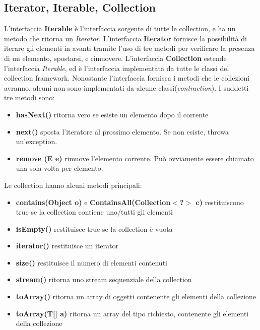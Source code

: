 \documentclass[11pt]{article}
\begin{document}
\subsection{Iterator, Iterable, Collection}
L'interfaccia \textbf{Iterable} è l'interfaccia sorgente di tutte le collection, e ha un metodo che ritorna un \textit{Iterator}. L'interfaccia \textbf{Iterator} fornisce la possibilità di iterare gli elementi in avanti tramite l'uso di tre metodi per verificare la presenza di un elemento, spostarsi, e rimuovere. L'interfaccia \textbf{Collection} estende l'interfaccia \textit{Iterable}, ed è l'interfaccia implementata da tutte le classi del collection framework. Nonostante l'interfaccia fornisca i metodi che le collezioni avranno, alcuni non sono implementati da alcune classi(\textit{contraction}).
I suddetti tre metodi sono:
\begin{itemize}
    \item \textbf{hasNext()} ritorna vero se esiste un elemento dopo il corrente
    \item \textbf{next()} sposta l'iteratore al prossimo elemento. Se non esiste, throwa un'exception.
    \item \textbf{remove (E e)} rimuove l'elemento corrente. Può ovviamente essere chiamato una sola volta per elemento.
\end{itemize}
Le collection hanno alcuni metodi principali: 
\begin{itemize}
    \item \textbf{contains(Object o)} e \textbf{ContainsAll(Collection$<$?$>$ c)} restituiscono true se la collection contiene uno/tutti gli elementi
    \item \textbf{isEmpty()} restituisce true se la collection è vuota 
    \item \textbf{iterator()} restituisce un iterator 
    \item \textbf{size()} restituisce il numero di elementi contenuti
    \item \textbf{stream()} ritorna uno stream sequenziale della collection 
    \item \textbf{toArray()} ritorna un array di oggetti contenente gli elementi della collezione
    \item \textbf{toArray(T[] a)} ritorna un array del tipo richiesto, contenente gli elementi della collezione 
\end{itemize}
\end{document}
